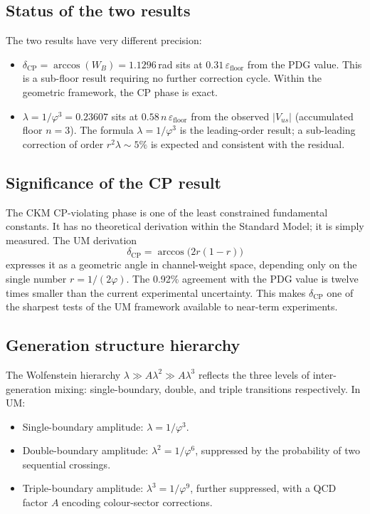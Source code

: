 \documentclass[12pt]{article}
\begin{document}
\subsection{Status of the two results}

The two results have very different precision:

\begin{itemize}
  \item $\delta_{\text{CP}} = \arccos(W_B) = 1.1296$\,rad sits at
        $0.31\,\varepsilon_{\text{floor}}$ from the PDG value. This is a
        sub-floor result requiring no further correction cycle. Within the
        geometric framework, the CP phase is exact.

  \item $\lambda = 1/\varphi^3 = 0.23607$ sits at $0.58\,n\,\varepsilon_{\text{floor}}$
        from the observed $|V_{us}|$ (accumulated floor $n = 3$). The formula
        $\lambda = 1/\varphi^3$ is the leading-order result; a sub-leading
        correction of order $r^2\lambda \sim 5\%$ is expected and consistent
        with the residual.
\end{itemize}

\subsection{Significance of the CP result}

The CKM CP-violating phase is one of the least constrained fundamental
constants. It has no theoretical derivation within the Standard Model; it
is simply measured. The UM derivation
\begin{equation}
  \delta_{\text{CP}} = \arccos\!\bigl(2r(1-r)\bigr)
  \label{eq:delta_clean}
\end{equation}
expresses it as a geometric angle in channel-weight space, depending only
on the single number $r = 1/(2\varphi)$. The 0.92\% agreement with the
PDG value is twelve times smaller than the current experimental
uncertainty. This makes $\delta_{\text{CP}}$ one of the sharpest tests
of the UM framework available to near-term experiments.

\subsection{Generation structure hierarchy}

The Wolfenstein hierarchy $\lambda \gg A\lambda^2 \gg A\lambda^3$ reflects
the three levels of inter-generation mixing: single-boundary, double, and
triple transitions respectively. In UM:
\begin{itemize}
  \item Single-boundary amplitude: $\lambda = 1/\varphi^3$.
  \item Double-boundary amplitude: $\lambda^2 = 1/\varphi^6$, suppressed
        by the probability of two sequential crossings.
  \item Triple-boundary amplitude: $\lambda^3 = 1/\varphi^9$, further
        suppressed, with a QCD factor $A$ encoding colour-sector corrections.
\end{itemize}
\end{document}
